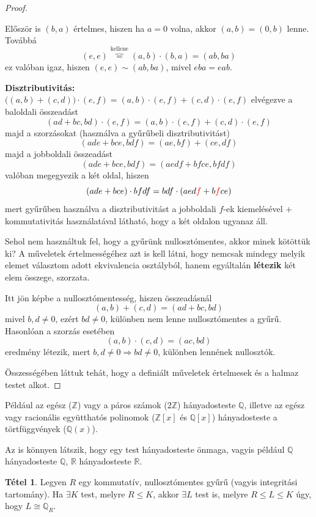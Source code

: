 \documentclass[12pt]{book}
\theoremstyle{plain} %
\theoremstyle{definition} %
\newtheorem{theo/}{Tétel}[section]
\newenvironment{theo}
  {\renewcommand{\qedsymbol}{$\clubsuit$}%
   \pushQED{\qed}\begin{theo/}}
  {\popQED\end{theo/}}
\theoremstyle{remark}
\renewcommand\qedsymbol{$\blacksquare$}
\numberwithin{equation}{section}  %
\begin{document}
\begin{proof}
\begin{itemize}
{				Először is $(b,a)$ értelmes, hiszen ha $a=0$ volna, akkor $(a,b) = (0,b)$ lenne. Továbbá
				\[ (e,e) \overbrace{=}^{\text{kellene}} (a,b)\cdot (b,a) = (ab,ba)   \]
				ez valóban igaz, hiszen $(e,e)\sim (ab,ba)$, mivel $eba=eab$.
			}
		\end{itemize}
		\textbf{Disztributivitás:} $\Big((a,b)+(c,d)\Big) \cdot (e,f) = (a,b)\cdot (e,f) + (c,d)\cdot (e,f)$
		elvégezve a baloldali összeadást
		\[ (ad+bc,bd)\cdot (e,f) = (a,b)\cdot (e,f) + (c,d)\cdot (e,f)  \]
		majd a szorzásokat (használva a gyűrűbeli disztributivitást)
		\[ (ade+bce, bdf) = (ae,bf) + (ce,df)  \]
		majd a jobboldali összeadást
		\[ (ade+bce, bdf) = (aedf + bfce, bfdf)  \]
		valóban megegyezik a két oldal, hiszen
		\[ (ade+bce)\cdot bfdf = bdf\cdot (aed\color{red}f\color{black}+b\color{red}f\color{black}ce)  \]
		mert gyűrűben használva a disztributivitást a jobboldali $f$-ek kiemelésével + kommutativitás használatával látható, hogy a két oldalon ugyanaz áll.		
	
		Sehol nem használtuk fel, hogy a gyűrünk nullosztómentes, akkor minek kötöttük ki? A műveletek értelmességéhez azt is kell látni, hogy nemcsak mindegy melyik elemet választom adott ekvivalencia osztályból, hanem egyáltalán \textbf{létezik} két elem összege, szorzata.
		
		Itt jön képbe a nullosztómentesség, hiszen összeadásnál
		\[ (a,b)+(c,d) = (ad+bc,bd)  \]
		mivel $b,d\neq 0$, ezért $bd\neq 0$, különben nem lenne nullosztómentes a gyűrű. Hasonlóan a szorzás esetében
		\[ (a,b)\cdot (c,d) = (ac,bd)  \]
		eredmény létezik, mert $b,d\neq 0 \Rightarrow bd\neq0$, különben lennének nullosztók.
		
		Összességében láttuk tehát, hogy a definiált műveletek értelmesek és a halmaz testet alkot.
	\end{proof} 
	
	Például az egész ($\mathbb{Z}$) vagy a páros számok ($2\mathbb{Z}$) hányadosteste $\mathbb{Q}$, illetve az egész vagy racionális együtthatós polinomok ($\mathbb{Z}[x]$ és $\mathbb{Q}[x]$) hányadosteste a törtfüggvények ($\mathbb{Q}(x)$).
	
	Az is könnyen látszik, hogy egy test hányadosteste önmaga, vagyis például $\mathbb{Q}$ hányadosteste $\mathbb{Q}$, $\mathbb{R}$ hányadosteste $\mathbb{R}$.
	
	\begin{theo}
		Legyen $R$ egy kommutatív, nullosztómentes gyűrű (vagyis integritási tartomány). Ha $\exists K$ test, melyre $R\leq K$, akkor $\exists L$ test is, melyre $R\leq L \leq K$ úgy, hogy $L\cong \mathbb{Q}_R$.
	\end{theo}
	
\end{document}
